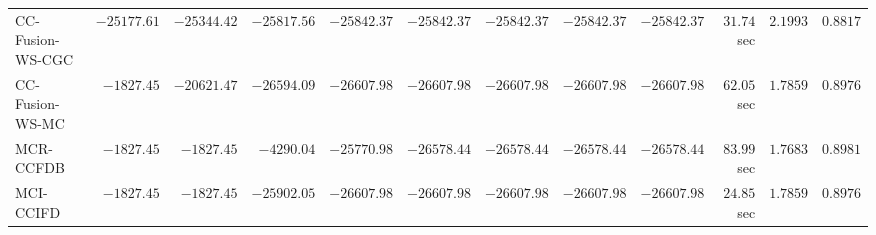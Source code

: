 \begin{table}[H]
\begin{tabular}{lrrrrrrrrrrr}
    CC-Fusion-WS-CGC & $    -25177.61$ & $    -25344.42$ & $    -25817.56$ & $    -25842.37$ & $    -25842.37$ & $    -25842.37$ & $    -25842.37$ & $    -25842.37$ & $        31.74$ sec    & $       2.1993$  & $       0.8817$ \\ 
     CC-Fusion-WS-MC & $     -1827.45$ & $    -20621.47$ & $    -26594.09$ & $    -26607.98$ & $    -26607.98$ & $    -26607.98$ & $    -26607.98$ & $    -26607.98$ & $        62.05$ sec    & $       1.7859$  & $       0.8976$ \\ 
\cmidrule{1-1} 
           MCR-CCFDB & $     -1827.45$ & $     -1827.45$ & $     -4290.04$ & $    -25770.98$ & $    -26578.44$ & $    -26578.44$ & $    -26578.44$ & $    -26578.44$ & $        83.99$ sec    & $       1.7683$  & $       0.8981$ \\ 
\cmidrule{1-1} 
           MCI-CCIFD & $     -1827.45$ & $     -1827.45$ & $    -25902.05$ & $    -26607.98$ & $    -26607.98$ & $    -26607.98$ & $    -26607.98$ & $    -26607.98$ & $        24.85$ sec    & $       1.7859$  & $       0.8976$ \\ 
\bottomrule
\end{tabular}
\end{table}


